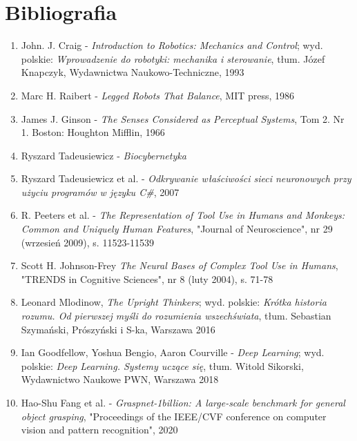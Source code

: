 \documentclass{article}
\begin{document}
\section*{\LARGE{Bibliografia}} 
\begin{enumerate}
\item John. J. Craig - \emph{Introduction to Robotics: Mechanics and Control}; wyd. polskie: \emph{Wprowadzenie do robotyki: mechanika i sterowanie}, tłum. Józef Knapczyk, Wydawnictwa Naukowo-Techniczne, 1993

\item Marc H. Raibert - \emph{Legged Robots That Balance}, MIT press, 1986

\item James J. Ginson - \emph{The Senses Considered as Perceptual Systems}, Tom 2. Nr 1. Boston: Houghton Mifflin, 1966

\item Ryszard Tadeusiewicz - \emph{Biocybernetyka}

\item Ryszard Tadeusiewicz et al. - \emph{Odkrywanie właściwości sieci neuronowych przy użyciu programów w języku C\#}, 2007

\item R. Peeters et al. - \emph{The Representation of Tool Use in Humans and Monkeys: Common and Uniquely Human Features}, "Journal of Neuroscience", nr 29 (wrzesień 2009), s. 11523-11539

\item Scott H. Johnson-Frey \emph{The Neural Bases of Complex Tool Use in Humans}, "TRENDS in Cognitive Sciences", nr 8 (luty 2004), s. 71-78

\item  Leonard Mlodinow, \emph{The Upright Thinkers}; wyd. polskie: \emph{Krótka historia rozumu. Od pierwszej myśli do rozumienia wszechświata}, tłum. Sebastian Szymański, Prószyński i S-ka, Warszawa 2016

\item Ian Goodfellow, Yoshua Bengio, Aaron Courville - \emph{Deep Learning}; wyd. polskie: \emph{Deep Learning. Systemy uczące się}, tłum. Witold Sikorski, Wydawnictwo Naukowe PWN, Warszawa 2018

\item Hao-Shu Fang et al. - \emph{Graspnet-1billion: A large-scale benchmark for general object grasping}, "Proceedings of the IEEE/CVF conference on computer vision and pattern recognition", 2020


\end{enumerate}
\end{document}
